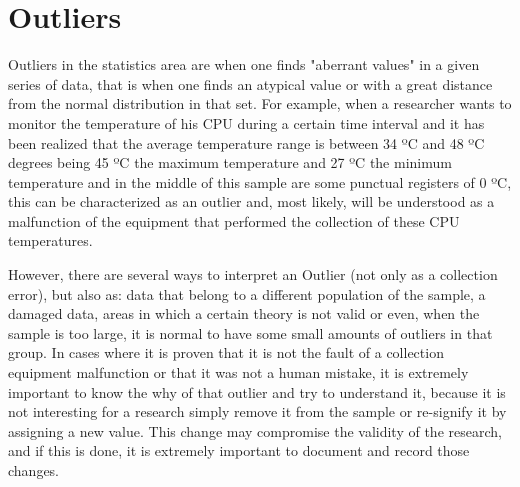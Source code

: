 \chapter{Outliers}


Outliers in the statistics area are when one finds "aberrant values" in a given 
series of data, that is when one finds an atypical value or with a great distance 
from the normal distribution in that set. For example, when a researcher wants to 
monitor the temperature of his CPU during a certain time interval and it has been 
realized that the average temperature range is between 34 ºC and 48 ºC degrees
being 45 ºC the maximum temperature and 27 ºC the minimum temperature and in the 
middle of this sample are some punctual registers of 0 ºC, this can be characterized
as an outlier and, most likely, will be understood as a malfunction of the equipment
that performed the collection of these CPU temperatures.

However, there are several ways to interpret an Outlier (not only as a collection 
error), but also as: data that belong to a different population of the sample, a 
damaged data, areas in which a certain theory is not valid or even, when the sample 
is too large, it is normal to have some small amounts of outliers in that group.
In cases where it is proven that it is not the fault of a collection equipment 
malfunction or that it was not a human mistake, it is extremely important to know 
the why of that outlier and try to understand it, because it is not interesting for 
a research simply remove it from the sample or re-signify it by assigning a new 
value. This change may compromise the validity of the research, and if this is 
done, it is extremely important to document and record those changes.